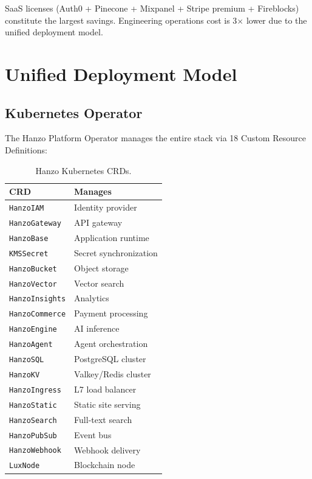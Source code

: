 \documentclass[11pt,twocolumn]{article}
\begin{document}
SaaS licenses (Auth0 + Pinecone + Mixpanel + Stripe premium + Fireblocks) constitute the largest savings. Engineering operations cost is 3$\times$ lower due to the unified deployment model.

\section{Unified Deployment Model}
\label{sec:deployment}

\subsection{Kubernetes Operator}

The Hanzo Platform Operator manages the entire stack via 18 Custom Resource Definitions:

\begin{table}[H]
\centering
\caption{Hanzo Kubernetes CRDs.}
\footnotesize
\begin{tabular}{@{}ll@{}}
\toprule
CRD & Manages \\
\midrule
\texttt{HanzoIAM} & Identity provider \\
\texttt{HanzoGateway} & API gateway \\
\texttt{HanzoBase} & Application runtime \\
\texttt{KMSSecret} & Secret synchronization \\
\texttt{HanzoBucket} & Object storage \\
\texttt{HanzoVector} & Vector search \\
\texttt{HanzoInsights} & Analytics \\
\texttt{HanzoCommerce} & Payment processing \\
\texttt{HanzoEngine} & AI inference \\
\texttt{HanzoAgent} & Agent orchestration \\
\texttt{HanzoSQL} & PostgreSQL cluster \\
\texttt{HanzoKV} & Valkey/Redis cluster \\
\texttt{HanzoIngress} & L7 load balancer \\
\texttt{HanzoStatic} & Static site serving \\
\texttt{HanzoSearch} & Full-text search \\
\texttt{HanzoPubSub} & Event bus \\
\texttt{HanzoWebhook} & Webhook delivery \\
\texttt{LuxNode} & Blockchain node \\
\bottomrule
\end{tabular}
\end{table}
\end{document}
